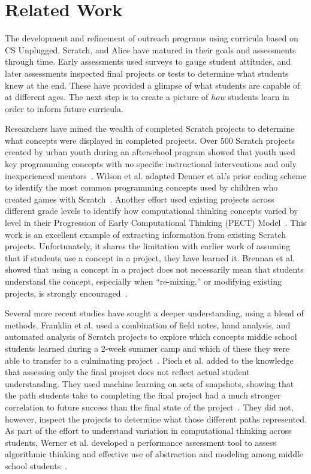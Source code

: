 \section{Related Work}
The development and refinement of outreach programs using curricula based on CS
Unplugged, Scratch, and Alice have matured in their goals and assessments
through time. Early assessments used surveys to gauge student attitudes, and
later assessments inspected final projects or tests to determine what students
knew at the end. These have provided a glimpse of what students are capable of
at different ages. The next step is to create a picture of \emph{how} students
learn in order to inform future curricula.

Researchers have mined the wealth of completed Scratch projects to determine
what concepts were displayed in completed projects. Over 500 Scratch projects
created by urban youth during an afterschool program showed that youth used key
programming concepts with no specific instructional interventions and only
inexperienced mentors~\cite{Maloney:2008:PCU:1352135.1352260}. Wilson et
al. adapted Denner et al.'s prior coding scheme to identify the most common
programming concepts used by children who created games with
Scratch~\cite{Denner:2012:CGC:2072695.2073050, wilson12}. Another effort used
existing projects across different grade levels to identify how computational
thinking concepts varied by level in their Progression of Early Computational
Thinking (PECT) Model~\cite{Seiter:2013:MLP:2493394.2493403}. This work is an
excellent example of extracting information from existing Scratch
projects. Unfortunately, it shares the limitation with earlier work of assuming
that if students use a concept in a project, they have learned it. Brennan et
al. showed that using a concept in a project does not necessarily mean that
students understand the concept, especially when ``re-mixing,'' or modifying
existing projects, is strongly encouraged~\cite{brennan12}.

Several more recent studies have sought a deeper understanding, using a blend
of methods. Franklin et al. used a combination of field notes, hand analysis,
and automated analysis of Scratch projects to explore which concepts middle
school students learned during a 2-week summer camp and which of these they
were able to transfer to a culminating
project~\cite{Boe:2013:HLS:2445196.2445265, Franklin:2013:SBO}. Piech et
al. added to the knowledge that assessing only the final project does not
reflect actual student understanding. They used machine learning on sets of
snapshots, showing that the path students take to completing the final project
had a much stronger correlation to future success than the final state of the
project~\cite{Piech:2012:MSL:2157136.2157182}. They did not, however, inspect
the projects to determine what those different paths represented. As part of
the effort to understand variation in computational thinking across students,
Werner et al. developed a performance assessment tool to assess algorithmic
thinking and effective use of abstraction and modeling among middle school
students~\cite{Werner:2012:FPA:2157136.2157200}.

